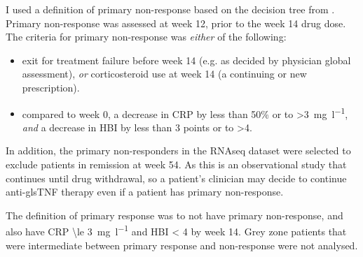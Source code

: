 \begin{outline}
I used a definition of primary non-response based on the decision tree from \textcite{kennedy2019PredictorsAntiTNFTreatment}.
Primary non-response was assessed at week 12, prior to the week 14 drug dose. The criteria for primary non-response was \emph{either} of the following: 
\begin{itemize}
    \item exit for treatment failure before week 14 (e.g. as decided by physician global assessment), \emph{or} corticosteroid use at week 14 (a continuing or new prescription).
    \item compared to week 0, a decrease in \gls{CRP} by less than 50\% or to >\SI{3}{\milli\gram\per\litre}, \emph{and} a decrease in \gls{HBI} by less than 3 points or to >4.
\end{itemize}
In addition, the primary non-responders in the \gls{RNAseq} dataset were selected to exclude patients in remission at week 54.
As this is an observational study that continues until drug withdrawal, so a patient's clinician may decide to continue anti-gls{TNF} therapy even if a patient has primary non-response.

The definition of primary response was to not have primary non-response, and also have \gls{CRP} \SI{\le 3}{\milli\gram\per\litre} and \gls{HBI} < 4 by week 14.
Grey zone patients that were intermediate between primary response and non-response were not analysed.

%


\end{outline}
